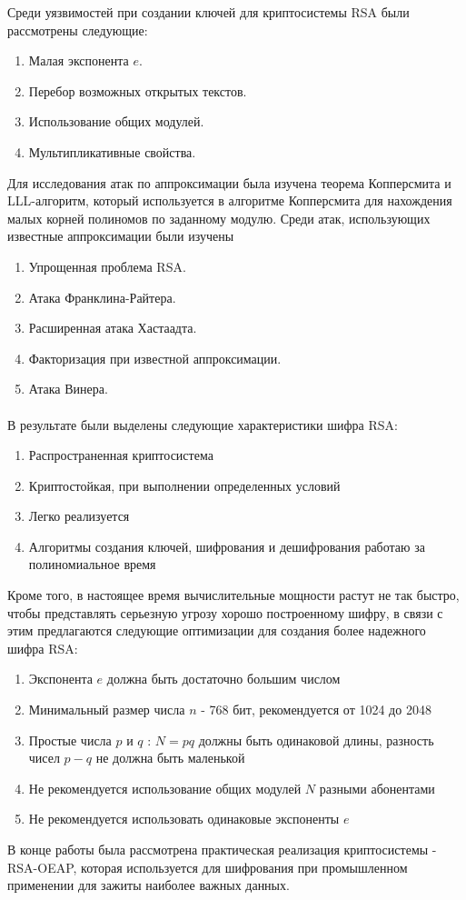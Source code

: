 	Среди уязвимостей при создании ключей для криптосистемы RSA были рассмотрены следующие:
		\begin{enumerate}
			\item Малая экспонента $e$.
			\item Перебор возможных открытых текстов.
			\item Использование общих модулей.
			\item Мультипликативные свойства.
		\end{enumerate}

	Для исследования атак по аппроксимации была изучена теорема Копперсмита и LLL-алгоритм, который используется в алгоритме Копперсмита для нахождения малых корней полиномов по заданному модулю. Среди атак, использующих известные аппроксимации были изучены
		\begin{enumerate}
			\item Упрощенная проблема RSA.
			\item Атака Франклина-Райтера.
			\item Расширенная атака Хастаадта.
			\item Факторизация при известной аппроксимации.
			\item Атака Винера.
		\end{enumerate}

	\paragraph{} В результате были выделены следующие характеристики шифра RSA:

		\begin{enumerate}
			\item Распространенная криптосистема
			\item Криптостойкая, при выполнении определенных условий
			\item Легко реализуется
			\item Алгоритмы создания ключей, шифрования и дешифрования работаю за полиномиальное время
		\end{enumerate}	

	Кроме того, в настоящее время вычислительные мощности растут не так быстро, чтобы представлять серьезную угрозу хорошо построенному шифру, в связи с этим предлагаются следующие оптимизации для создания более надежного шифра RSA:
	
		\begin{enumerate}
			\item Экспонента $e$ должна быть достаточно большим числом
			\item Минимальный размер числа $n$ - 768 бит, рекомендуется от 1024 до 2048
			\item Простые числа $p$ и $q$ : $N=pq$ должны быть одинаковой длины, разность чисел $p - q$ не должна быть маленькой
			\item Не рекомендуется использование общих модулей $N$ разными абонентами
			\item Не рекомендуется использовать одинаковые экспоненты $e$
		\end{enumerate}

	В конце работы была рассмотрена практическая реализация криптосистемы - RSA-OEAP, которая используется для шифрования при промышленном применении для зажиты наиболее важных данных.